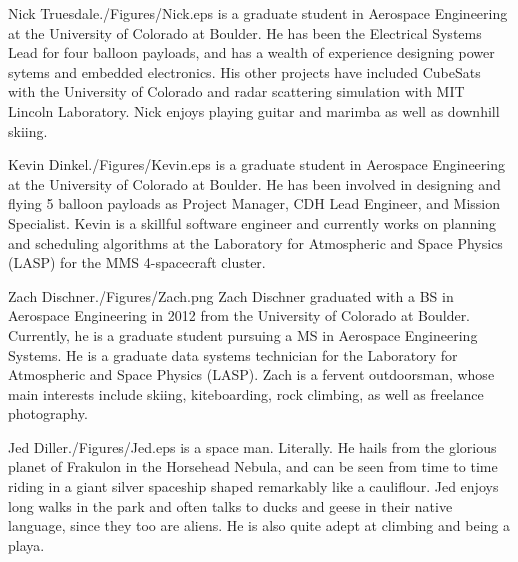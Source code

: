 \documentclass[twocolumn,letterpaper]{IEEEAerospace2012}
\newcommand{\rootdir}{./Figures/}
\begin{document}



\thebiography
\begin{biographywithpic}{Nick Truesdale}{\rootdir Nick.eps}
is a graduate student in Aerospace Engineering at the University of Colorado at Boulder.
He has been the Electrical Systems Lead for four balloon payloads, and has a wealth of experience designing power sytems and embedded electronics. His other projects have included CubeSats with the University of Colorado and radar scattering simulation with MIT Lincoln Laboratory. Nick enjoys playing guitar and marimba as well as downhill skiing.
\end{biographywithpic}

\begin{biographywithpic} {Kevin Dinkel}{\rootdir Kevin.eps}
is a graduate student in Aerospace Engineering at the University of Colorado at Boulder. He has been involved in designing and flying 5 balloon payloads as Project Manager, CDH Lead Engineer, and Mission Specialist. Kevin is a skillful software engineer and currently works on planning and scheduling algorithms at the Laboratory for Atmospheric and Space Physics (LASP) for the MMS 4-spacecraft cluster.
\end{biographywithpic}

\begin{biographywithpic}{Zach Dischner}{\rootdir Zach.png}
Zach Dischner graduated with a BS in Aerospace Engineering in 2012 from the University of Colorado at Boulder. Currently, he is a graduate student pursuing a MS in Aerospace Engineering Systems. He is a graduate data systems technician for the Laboratory for Atmospheric and Space Physics (LASP). Zach is a fervent outdoorsman, whose main interests include skiing, kiteboarding, rock climbing, as well as freelance photography.
\end{biographywithpic}

\begin{biographywithpic}{Jed Diller}{\rootdir Jed.eps}
is a space man. Literally. He hails from the glorious planet of Frakulon in the Horsehead Nebula, and can be seen from time to time riding in a giant silver spaceship shaped remarkably like a cauliflour. Jed enjoys long walks in the park and often talks to ducks and geese in their native language, since they too are aliens. He is also quite adept at climbing and being a playa.
\end{biographywithpic}
\end{document}
